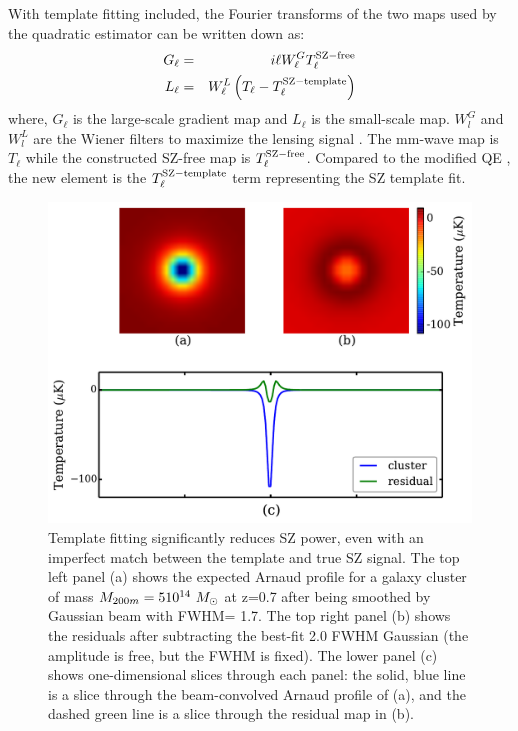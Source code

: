 With template fitting included, the Fourier transforms of the two maps used by the quadratic estimator can be written down as:
\begin{eqnarray}
G_{\ell} &=& i\ell W^{G}_{\ell} T^{\rm SZ-free}_{\ell}\\
L_{\ell} &=& W^{L}_{\ell} \left(T_{\ell} - T_\ell^{\rm SZ-template}\right)
\end{eqnarray}
where, $G_{\ell}$ is the large-scale gradient map and $L_{\ell}$ is the small-scale map. 
$W^{G}_{l}$ and $W^{L}_{l} $ are the Wiener filters to maximize the lensing signal \cite{hu06}. 
The mm-wave map is $T_{\ell}$ while the constructed SZ-free map is $T^{\rm SZ-free}_{\ell}$. 
Compared to the modified QE \citep{madhavacheril15,raghunathan18}, the new element is the $T_\ell^{\rm SZ-template}$ term representing the SZ template fit. 

\begin{figure}
\includegraphics[width=\linewidth]{figs/template_fitting.pdf}
 \caption{Template fitting significantly reduces SZ power, even with an imperfect match between the template and true SZ signal. 
The top left panel (a) shows the expected Arnaud profile for a galaxy cluster of mass $M_{200m} = 5 10^{14}~ {M}_{\odot}$ at z=0.7 after being smoothed by Gaussian beam with FWHM= 1\arcmin.7.
The top right panel (b) shows the residuals after subtracting the best-fit 2\arcmin.0 FWHM Gaussian (the amplitude is free, but the FWHM is fixed). 
The lower panel (c) shows one-dimensional slices through each panel: the solid, blue line is a slice through the beam-convolved Arnaud profile of (a), and the dashed green line is a slice through the residual map in (b). 
 } 
\label{fig:residual}
\end{figure}
